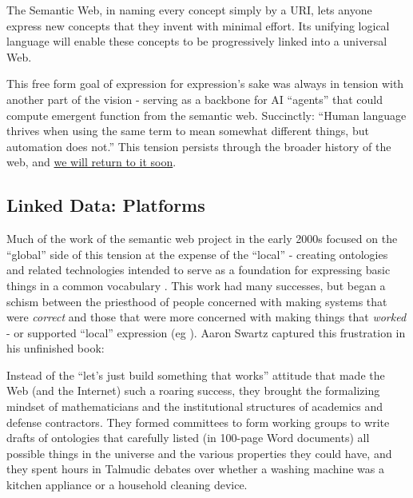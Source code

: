 \documentclass{article}
\renewenvironment{leftbar}
{\vspace{6pt}\def\FrameCommand{\hspace{0em}\vrule width 0.5pt \hspace{1em}}\MakeFramed {\advance\hsize-\width \FrameRestore}}
{\endMakeFramed}
\begin{document}
\begin{leftbar}
The Semantic Web, in naming every concept simply by a URI, lets anyone
express new concepts that they invent with minimal effort. Its unifying
logical language will enable these concepts to be progressively linked
into a universal Web. \cite{berners-leeSemanticWeb2001} 
\end{leftbar}

This free form goal of expression for expression's sake was always in
tension with another part of the vision - serving as a backbone for AI
``agents'' that could compute emergent function from the semantic web.
Succinctly: ``Human language thrives when using the same term to mean
somewhat different things, but automation does not.'' \cite{berners-leeSemanticWeb2001}  This tension persists through the
broader history of the web, and
\protect\hyperlink{the-near-future-of-surveillance-capitalism-knowledge-graphs-get-chatbots.}{we
will return to it soon}.

\hypertarget{linked-data-platforms}{%
\subsection{Linked Data: Platforms}\label{linked-data-platforms}}

Much of the work of the semantic web project in the early 2000s focused
on the ``global'' side of this tension at the expense of the ``local'' -
creating ontologies and related technologies intended to serve as a
foundation for expressing basic things in a common vocabulary \cite{hitzlerReviewSemanticWeb2021} . This work had many successes, but
began a schism between the priesthood of people concerned with making
systems that were \emph{correct} and those that were more concerned with
making things that \emph{worked} - or supported ``local'' expression (eg
\cite{palmerDitchingSemanticWeb2008} ). Aaron Swartz captured
this frustration in his unfinished book:

\begin{leftbar}
Instead of the ``let's just build something that works'' attitude that
made the Web (and the Internet) such a roaring success, they brought the
formalizing mindset of mathematicians and the institutional structures
of academics and defense contractors. They formed committees to form
working groups to write drafts of ontologies that carefully listed (in
100-page Word documents) all possible things in the universe and the
various properties they could have, and they spent hours in Talmudic
debates over whether a washing machine was a kitchen appliance or a
household cleaning device. \cite{swartzAaronSwartzProgrammable2013} 
\end{leftbar}
\end{document}
